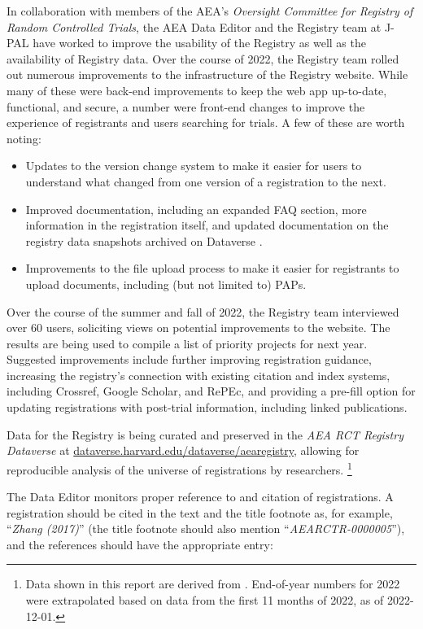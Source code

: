 In collaboration with members of the AEA's \textit{Oversight Committee for Registry of Random Controlled Trials}, the AEA Data Editor and the Registry team at J-PAL have worked to improve the usability of the Registry as well as the availability of Registry data. Over the course of 2022, the Registry team rolled out numerous improvements to the infrastructure of the Registry website. While many of these were back-end improvements to keep the web app up-to-date, functional, and secure, a number were front-end changes to improve the experience of registrants and users searching for trials. A few of these are worth noting:
\begin{itemize}
    \item Updates to the version change system to make it easier for users to understand what changed from one version of a registration to the next.
    \item Improved documentation, including an expanded FAQ section, more information in the registration itself, and updated documentation on the registry data snapshots archived on Dataverse \citep[see f.i.][]{DVN/TGMJFD_2022}.
    \item Improvements to the file upload process to make it easier for registrants to upload documents, including (but not limited to) PAPs.
\end{itemize}
Over the course of the summer and fall of 2022, the Registry team interviewed over 60 users, soliciting views on potential improvements to the website. The results are being used to compile  a list of priority projects for next year. Suggested improvements include further improving registration guidance, increasing the registry’s connection with existing citation and index systems, including Crossref, Google Scholar, and RePEc, and providing a pre-fill option for updating registrations with post-trial information, including linked publications. 

Data for the Registry is being curated and preserved in the \textit{AEA RCT Registry Dataverse} at 
\href{https://dataverse.harvard.edu/dataverse/aearegistry}{dataverse.harvard.edu/dataverse/aearegistry}, allowing for reproducible analysis of the universe of registrations by researchers.%
\footnote{Data shown in this report are derived from \citet{DVN/TGMJFD_2022}. End-of-year numbers for 2022 were extrapolated based on data from the first 11 months of 2022, as of 2022-12-01. }

The Data Editor monitors proper reference to and citation of registrations. A registration should be cited in the text and the title footnote as, for example, ``\textit{Zhang (2017)}'' (the title footnote should also mention ``\textit{AEARCTR-0000005}''), and the references should have the appropriate entry:

